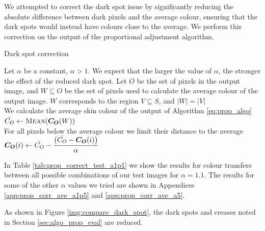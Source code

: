 We attempted to correct the dark spot issue by significantly reducing the absolute difference between dark pixels and the average colour, ensuring that the dark spots would instead have colours close to the average. We perform this correction on the output of the proportional adjustment algorithm.

\begin{algorithm}[H]
\caption{Dark spot correction}
\label{eq:prop_corr_algo}
\begin{algorithmic}
\State Let $\alpha$ be a constant, $\alpha  > 1$. We expect that the larger the value of $\alpha$, the stronger the effect of the reduced dark spot.
\State Let $O$ be the set of pixels in the output image, and $W \subseteq O$ be the set of pixels used to calculate the average colour of the output image. $W$ corresponds to the region $V \subseteq S$, and $\left|W\right| = \left|V\right|$ \\
\State We calculate the average skin colour of the output of Algorithm \ref{eq:prop_algo}
\State $\mean{C_O} \gets \Call{Mean}{\vect{C_O}(W)}$\\
\State For all pixels below the average colour we limit their distance to the average 
\State $\boldsymbol{C_O}(i) \gets \displaystyle \bar{C_O} - \frac{\left(\bar{C_O} - \boldsymbol{C_O}(i)\right)}{\alpha}$
\EndIf
\EndFor
\end{algorithmic}
\end{algorithm}


In Table \ref{tab:prop_correct_test_a1p1} we show the results for colour transfers between all possible combinations of our test images for $\alpha = 1.1$. The results for some of the other $\alpha$ values we tried are shown in Appendices \ref{app:prop_corr_ave_a1p5} and \ref{app:prop_corr_ave_a5}.



As shown in Figure \ref{img:compare_dark_spot}, the dark spots and creases noted in Section \ref{sec:algo_prop_eval} are reduced.


